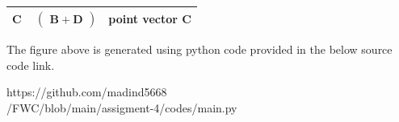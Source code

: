 \documentclass[a4paper,12pt]{report}
\let\vec\mathbf
\begin{document}
\begin{multicols}{2}
\begin{center}
\begin{tabular}{|c|c|c|}
	\large\textbf{C} & $\ \begin{pmatrix} \vec{B+D} \end{pmatrix}$ & \large point vector C\\ 
      \hline
   \end{tabular}
 \end{center}\vspace{5mm} 
\raggedright\large{The figure above is generated using python code provided in the below source code link.}\vspace{2mm}\\
\begin{mdframed}
\raggedright\large{https://github.com/madind5668 \\ /FWC/blob/main/assigment-4/codes/main.py}
\end{mdframed}
\end{multicols}
\end{document}
